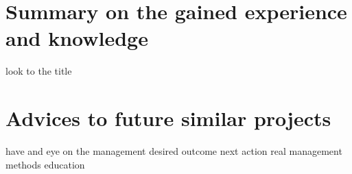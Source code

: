 \section{Summary on the gained experience and knowledge}
look to the title
\section{Advices to future similar projects}
have and eye on the management
desired outcome next action
real management methods education